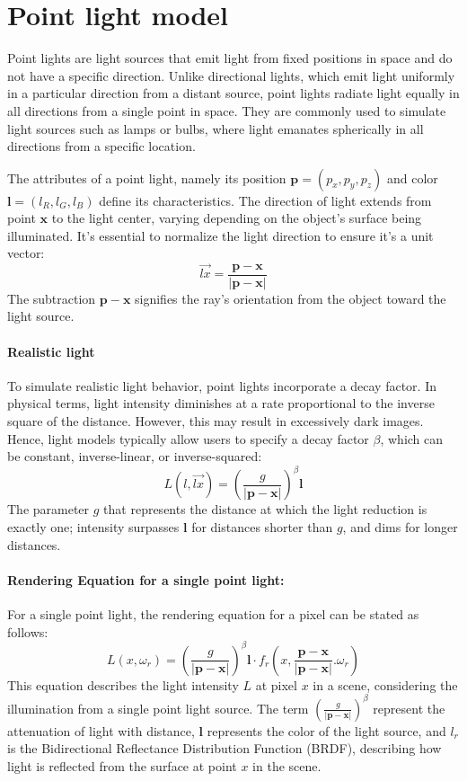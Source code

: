 \section{Point light model}

Point lights are light sources that emit light from fixed positions in space and do not have a specific direction. 
Unlike directional lights, which emit light uniformly in a particular direction from a distant source, point lights radiate light equally in all directions from a single point in space. 
They are commonly used to simulate light sources such as lamps or bulbs, where light emanates spherically in all directions from a specific location.

The attributes of a point light, namely its position $\mathbf{p} = (p_x, p_y, p_z)$ and color $\mathbf{l} = (l_R, l_G, l_B)$ define its characteristics.
The direction of light extends from point $\mathbf{x}$ to the light center, varying depending on the object's surface being illuminated.
It's essential to normalize the light direction to ensure it's a unit vector:
\[\overrightarrow{lx}=\dfrac{\mathbf{p}-\mathbf{x}}{\left\lvert \mathbf{p}-\mathbf{x}\right\rvert}\]
The subtraction $\mathbf{p}-\mathbf{x}$ signifies the ray's orientation from the object toward the light source.

\paragraph*{Realistic light}
To simulate realistic light behavior, point lights incorporate a decay factor. 
In physical terms, light intensity diminishes at a rate proportional to the inverse square of the distance.
However, this may result in excessively dark images. 
Hence, light models typically allow users to specify a decay factor $\beta$, which can be constant, inverse-linear, or inverse-squared:
\[L(l,\overrightarrow{lx})=\left(\dfrac{g}{\left\lvert \mathbf{p}-\mathbf{x}\right\rvert}\right)^{\beta}\mathbf{l}\]
The parameter $g$ that represents the distance at which the light reduction is exactly one; intensity surpasses $\mathbf{l}$ for distances shorter than $g$, and dims for longer distances.

\paragraph*{Rendering Equation for a single point light:}
For a single point light, the rendering equation for a pixel can be stated as follows:
\[L(x,\omega_r)=\left(\dfrac{g}{\left\lvert \mathbf{p}-\mathbf{x}\right\rvert}\right)^{\beta}\mathbf{l}\cdot f_r\left(x,\dfrac{\mathbf{p}-\mathbf{x}}{\left\lvert \mathbf{p}-\mathbf{x}\right\rvert}.\omega_r\right)\]
This equation describes the light intensity $L$ at pixel $x$ in a scene, considering the illumination from a single point light source.
The term $\left(\frac{g}{\left\lvert \mathbf{p}-\mathbf{x}\right\rvert}\right)^{\beta}$ represent the attenuation of light with distance, $\mathbf{l}$ represents the color of the light source, and $l_r$ is the Bidirectional Reflectance Distribution Function (BRDF), describing how light is reflected from the surface at point $x$ in the scene.